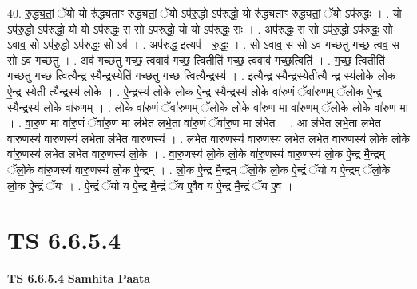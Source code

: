 \documentclass[17pt]{extarticle}
\begin{document}
40. रु॒द्ध्य॒तां॒ ॅयो यो रु॑द्ध्यताꣳ रुद्ध्यतां॒ ॅयो ऽप॑रु॒द्धो ऽप॑रुद्धो॒ यो रु॑द्ध्यताꣳ रुद्ध्यतां॒ ॅयो ऽप॑रुद्धः । . यो ऽप॑रु॒द्धो ऽप॑रुद्धो॒ यो यो ऽप॑रुद्धः॒ स सो ऽप॑रुद्धो॒ यो यो ऽप॑रुद्धः॒ सः । . अप॑रुद्धः॒ स सो ऽप॑रु॒द्धो ऽप॑रुद्धः॒ सो ऽवाव॒ सो ऽप॑रु॒द्धो ऽप॑रुद्धः॒ सो ऽव॑ । . अप॑रुद्ध॒ इत्यप॑ - रु॒द्धः॒ । . सो ऽवाव॒ स सो ऽव॑ गच्छतु गच्छ॒ त्वव॒ स सो ऽव॑ गच्छतु । . अव॑ गच्छतु गच्छ॒ त्ववाव॑ गच्छ॒ त्वितीति॑ गच्छ॒ त्ववाव॑ गच्छ॒त्विति॑ । . ग॒च्छ॒ त्वितीति॑ गच्छतु गच्छ॒ त्वित्यै॒न्द्र स्यै॒न्द्रस्येति॑ गच्छतु गच्छ॒ त्वित्यै॒न्द्रस्य॑ । . इत्यै॒न्द्र स्यै॒न्द्रस्येतीत्यै॒ न्द्र स्य॑लो॒के लो॒क ऐ॒न्द्र स्येती त्यै॒न्द्रस्य॑ लो॒के । . ऐ॒न्द्रस्य॑ लो॒के लो॒क ऐ॒न्द्र स्यै॒न्द्रस्य॑ लो॒के वा॑रु॒णं ॅवा॑रु॒णम् ॅलो॒क ऐ॒न्द्र स्यै॒न्द्रस्य॑ लो॒के वा॑रु॒णम् । . लो॒के वा॑रु॒णं ॅवा॑रु॒णम् ॅलो॒के लो॒के वा॑रु॒ण मा वा॑रु॒णम् ॅलो॒के लो॒के वा॑रु॒ण मा । . वा॒रु॒ण मा वा॑रु॒णं ॅवा॑रु॒ण मा ल॑भेत लभे॒ता वा॑रु॒णं ॅवा॑रु॒ण मा ल॑भेत । . आ ल॑भेत लभे॒ता ल॑भेत वारु॒णस्य॑ वारु॒णस्य॑ लभे॒ता ल॑भेत वारु॒णस्य॑ । . ल॒भे॒त॒ वा॒रु॒णस्य॑ वारु॒णस्य॑ लभेत लभेत वारु॒णस्य॑ लो॒के लो॒के वा॑रु॒णस्य॑ लभेत लभेत वारु॒णस्य॑ लो॒के । . वा॒रु॒णस्य॑ लो॒के लो॒के वा॑रु॒णस्य॑ वारु॒णस्य॑ लो॒क ऐ॒न्द्र मै॒न्द्रम् ॅलो॒के वा॑रु॒णस्य॑ वारु॒णस्य॑ लो॒क ऐ॒न्द्रम् । . लो॒क ऐ॒न्द्र मै॒न्द्रम् ॅलो॒के लो॒क ऐ॒न्द्रं ॅयो य ऐ॒न्द्रम् ॅलो॒के लो॒क ऐ॒न्द्रं ॅयः । . ऐ॒न्द्रं ॅयो य ऐ॒न्द्र मै॒न्द्रं ॅय ए॒वैव य ऐ॒न्द्र मै॒न्द्रं ॅय ए॒व । \newline
\pagebreak
{}

\section{ TS 6.6.5.4 }

\textbf{TS 6.6.5.4 } \newline
\textbf{Samhita Paata} \newline
\end{document}
